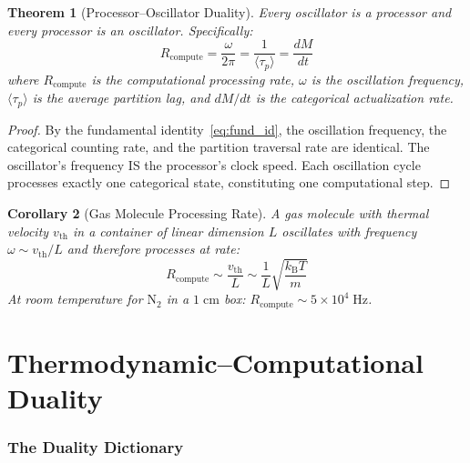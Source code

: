 \documentclass[twocolumn,10pt,a4paper]{article}
\theoremstyle{plain}
\newtheorem{theorem}{Theorem}[section]
\newtheorem{corollary}[theorem]{Corollary}
\theoremstyle{definition}
\theoremstyle{remark}
\newcommand{\kB}{k_{\mathrm{B}}}
\newcommand{\taup}{\tau_p}
\begin{document}
\begin{theorem}[Processor--Oscillator Duality]
\label{thm:proc_osc}
Every oscillator is a processor and every processor is an oscillator. Specifically:
\begin{equation}
    R_{\mathrm{compute}} = \frac{\omega}{2\pi} = \frac{1}{\langle\taup\rangle} = \frac{dM}{dt}
\end{equation}
where $R_{\mathrm{compute}}$ is the computational processing rate, $\omega$ is the oscillation frequency, $\langle\taup\rangle$ is the average partition lag, and $dM/dt$ is the categorical actualization rate.
\end{theorem}

\begin{proof}
By the fundamental identity~\eqref{eq:fund_id}, the oscillation frequency, the categorical counting rate, and the partition traversal rate are identical. The oscillator's frequency IS the processor's clock speed. Each oscillation cycle processes exactly one categorical state, constituting one computational step.
\end{proof}

\begin{corollary}[Gas Molecule Processing Rate]
A gas molecule with thermal velocity $v_{\mathrm{th}}$ in a container of linear dimension $L$ oscillates with frequency $\omega \sim v_{\mathrm{th}}/L$ and therefore processes at rate:
\begin{equation}
    R_{\mathrm{compute}} \sim \frac{v_{\mathrm{th}}}{L} \sim \frac{1}{L}\sqrt{\frac{\kB T}{m}}
\end{equation}
At room temperature for $\mathrm{N}_2$ in a $1\;\mathrm{cm}$ box: $R_{\mathrm{compute}} \sim 5 \times 10^4\;\mathrm{Hz}$.
\end{corollary}


\part{Thermodynamic--Computational Duality}
\label{part:duality}

\section{The Duality Dictionary}
\label{sec:dictionary}
\end{document}
